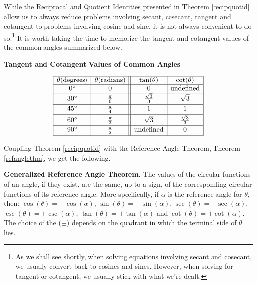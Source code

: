 While the Reciprocal and Quotient Identities presented in Theorem \ref{recipquotid} allow us to always reduce problems involving secant, cosecant, tangent and cotangent to problems involving cosine and sine, it is not always convenient to do so.\footnote{As we shall see shortly, when solving equations involving secant and cosecant, we usually convert back to cosines and sines.  However, when solving for tangent or cotangent, we usually stick with what we're dealt.}  It is worth taking the time to memorize the tangent and cotangent values of the common angles summarized below.

\begin{center}

\textbf{Tangent and Cotangent Values of Common Angles}

\vspace{-.25in}

\setlength{\extrarowheight}{4pt}

\[ \begin{array}{|c|c||c|c|} \hline
 \theta (\mbox{degrees}) &  \theta (\mbox{radians}) & \tan(\theta) & \cot(\theta) \\ \hline
0^{\circ} & 0 & 0 & \text{undefined} \\ \hline
30^{\circ} & \frac{\pi}{6} & \frac{\sqrt{3}}{3} & \sqrt{3} \\ [2pt] \hline
45^{\circ} & \frac{\pi}{4} & 1 & 1 \\ [2pt] \hline
60^{\circ} & \frac{\pi}{3} & \sqrt{3} & \frac{\sqrt{3}}{3} \\ [2pt] \hline
90^{\circ} & \frac{\pi}{2} & \text{undefined} & 0 \\ [2pt] \hline
\end{array} \]

\setlength{\extrarowheight}{2pt}

\end{center}

Coupling Theorem \ref{recipquotid} with the Reference Angle Theorem, Theorem \ref{refanglethm}, we get the following.

\smallskip

\colorbox{ResultColor}{\bbm

\begin{thm} \label{genrefanglethm} \textbf{Generalized Reference Angle Theorem.}  The values of the circular functions of an angle, if they exist, are the same, up to a sign, of the corresponding circular functions of its reference angle.  More specifically, if $\alpha$ is the reference angle for $\theta$,  then: $\cos(\theta)  = \pm \cos(\alpha)$, $\sin(\theta)  = \pm \sin(\alpha)$, $\sec(\theta)  = \pm \sec(\alpha)$, $\csc(\theta)  = \pm \csc(\alpha)$, $\tan(\theta)  = \pm \tan(\alpha)$ and $\cot(\theta)  = \pm \cot(\alpha)$.  The choice of the ($\pm$) depends on the quadrant in which the terminal side of $\theta$ lies. 

\end{thm}

\ebm}

